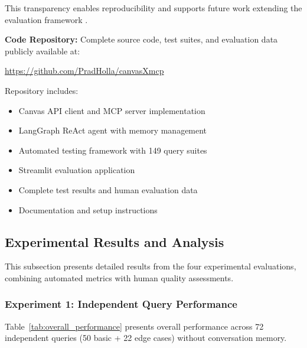 \documentclass{article}
\begin{document}
This transparency enables reproducibility and supports future work extending the evaluation framework \cite{genai2024higher}.

\textbf{Code Repository:} Complete source code, test suites, and evaluation data publicly available at:

\url{https://github.com/PradHolla/canvasXmcp}

Repository includes:
\begin{itemize}
    \item Canvas API client and MCP server implementation
    \item LangGraph ReAct agent with memory management
    \item Automated testing framework with 149 query suites
    \item Streamlit evaluation application
    \item Complete test results and human evaluation data
    \item Documentation and setup instructions
\end{itemize}


\subsection{Experimental Results and Analysis}

This subsection presents detailed results from the four experimental evaluations, combining automated metrics with human quality assessments.

\subsubsection{Experiment 1: Independent Query Performance}

Table~\ref{tab:overall_performance} presents overall performance across 72 independent queries (50 basic + 22 edge cases) without conversation memory.
\end{document}
